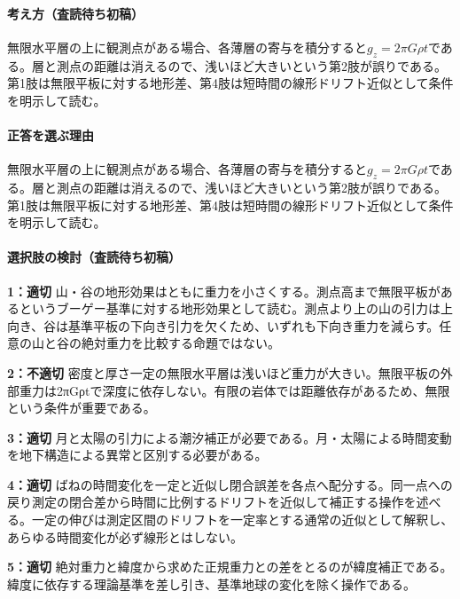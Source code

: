 \paragraph{考え方（査読待ち初稿）} 無限水平層の上に観測点がある場合、各薄層の寄与を積分すると\(g_z=2\pi G\rho t\)である。層と測点の距離は消えるので、浅いほど大きいという第2肢が誤りである。第1肢は無限平板に対する地形差、第4肢は短時間の線形ドリフト近似として条件を明示して読む。

\paragraph{正答を選ぶ理由} 無限水平層の上に観測点がある場合、各薄層の寄与を積分すると\(g_z=2\pi G\rho t\)である。層と測点の距離は消えるので、浅いほど大きいという第2肢が誤りである。第1肢は無限平板に対する地形差、第4肢は短時間の線形ドリフト近似として条件を明示して読む。

\paragraph{選択肢の検討（査読待ち初稿）}\mbox{}\par

\noindent\textbf{1：適切} 山・谷の地形効果はともに重力を小さくする。測点高まで無限平板があるというブーゲー基準に対する地形効果として読む。測点より上の山の引力は上向き、谷は基準平板の下向き引力を欠くため、いずれも下向き重力を減らす。任意の山と谷の絶対重力を比較する命題ではない。\par

\noindent\textbf{2：不適切} 密度と厚さ一定の無限水平層は浅いほど重力が大きい。無限平板の外部重力は2πGρtで深度に依存しない。有限の岩体では距離依存があるため、無限という条件が重要である。\par

\noindent\textbf{3：適切} 月と太陽の引力による潮汐補正が必要である。月・太陽による時間変動を地下構造による異常と区別する必要がある。\par

\noindent\textbf{4：適切} ばねの時間変化を一定と近似し閉合誤差を各点へ配分する。同一点への戻り測定の閉合差から時間に比例するドリフトを近似して補正する操作を述べる。一定の伸びは測定区間のドリフトを一定率とする通常の近似として解釈し、あらゆる時間変化が必ず線形とはしない。\par

\noindent\textbf{5：適切} 絶対重力と緯度から求めた正規重力との差をとるのが緯度補正である。緯度に依存する理論基準を差し引き、基準地球の変化を除く操作である。\par

